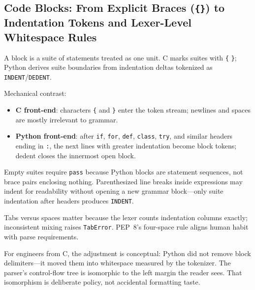 \subsection{Code Blocks: From Explicit Braces (\texttt{\{\}}) to Indentation Tokens and Lexer-Level Whitespace Rules}

A block is a suite of statements treated as one unit. C marks suites with \texttt{\{} \texttt{\}}; Python derives suite boundaries from indentation deltas tokenized as \texttt{INDENT}/\texttt{DEDENT}.

Mechanical contrast:

\begin{itemize}
    \item \textbf{C front-end}: characters \texttt{\{} and \texttt{\}} enter the token stream; newlines and spaces are mostly irrelevant to grammar.
    \item \textbf{Python front-end}: after \texttt{if}, \texttt{for}, \texttt{def}, \texttt{class}, \texttt{try}, and similar headers ending in \texttt{:}, the next lines with greater indentation become block tokens; dedent closes the innermost open block.
\end{itemize}

Empty suites require \texttt{pass} because Python blocks are statement sequences, not brace pairs enclosing nothing. Parenthesized line breaks inside expressions may indent for readability without opening a new grammar block---only suite indentation after headers produces \texttt{INDENT}.

Tabs versus spaces matter because the lexer counts indentation columns exactly; inconsistent mixing raises \texttt{TabError}. PEP~8's four-space rule aligns human habit with parse requirements.

For engineers from C, the adjustment is conceptual: Python did not remove block delimiters---it moved them into whitespace measured by the tokenizer. The parser's control-flow tree is isomorphic to the left margin the reader sees. That isomorphism is deliberate policy, not accidental formatting taste.
